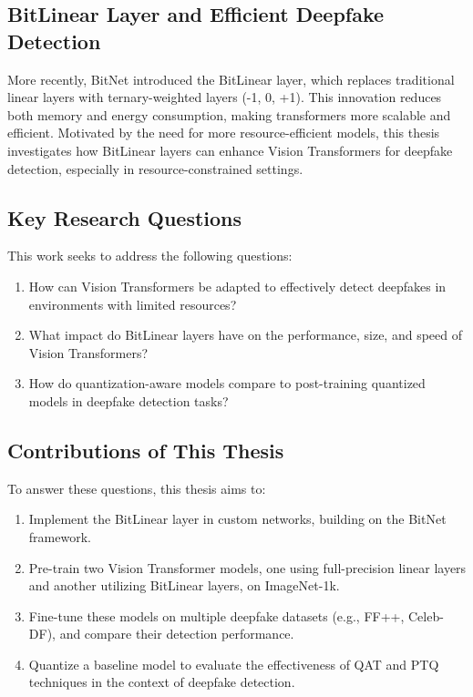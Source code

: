\documentclass[conference]{IEEEtran}
\begin{document}
		\subsection{BitLinear Layer and Efficient Deepfake Detection}
		More recently, BitNet introduced the BitLinear layer, which replaces traditional linear layers with ternary-weighted layers (-1, 0, +1). This innovation reduces both memory and energy consumption, making transformers more scalable and efficient. Motivated by the need for more resource-efficient models, this thesis investigates how BitLinear layers can enhance Vision Transformers for deepfake detection, especially in resource-constrained settings.
		
		\subsection{Key Research Questions}
		This work seeks to address the following questions:
		\begin{enumerate}
			\item How can Vision Transformers be adapted to effectively detect deepfakes in environments with limited resources?
			
			\item What impact do BitLinear layers have on the performance, size, and speed of Vision Transformers?
			
			\item How do quantization-aware models compare to post-training quantized models in deepfake detection tasks?
		\end{enumerate}
		
		\subsection{Contributions of This Thesis}
		To answer these questions, this thesis aims to:
		\begin{enumerate}
			\item Implement the BitLinear layer in custom networks, building on the BitNet framework.
			
			\item Pre-train two Vision Transformer models, one using full-precision linear layers and another utilizing BitLinear layers, on ImageNet-1k.
			
			\item Fine-tune these models on multiple deepfake datasets (e.g., FF++, Celeb-DF), and compare their detection performance.
			
			\item Quantize a baseline model to evaluate the effectiveness of QAT and PTQ techniques in the context of deepfake detection.
		\end{enumerate}
		
\end{document}
